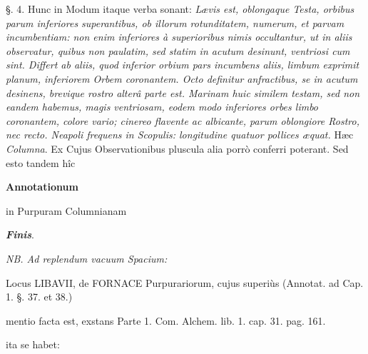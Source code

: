 \documentclass[a4paper, 11pt, oneside, polutonikogreek, german]{article}
\begin{document}
§. 4. Hunc in Modum itaque verba sonant: \emph{Lævis est, oblongaque Testa, orbibus parum inferiores superantibus, ob illorum rotunditatem, numerum, et parvam incumbentiam: non enim inferiores à superioribus nimis occultantur, ut in aliis observatur, quibus non paulatim, sed statim in acutum desinunt, ventriosi cum sint. Differt ab aliis, quod inferior orbium pars incumbens aliis, limbum exprimit planum, inferiorem Orbem coronantem. Octo definitur anfractibus, se in acutum desinens, brevique rostro alterâ parte est. Marinam huic similem testam, sed non eandem habemus, magis ventriosam, eodem modo inferiores orbes limbo coronantem, colore vario; cinereo flavente ac albicante, parum oblongiore Rostro, nec recto. Neapoli frequens in Scopulis: longitudine quatuor pollices æquat.} Hæc \emph{Columna}. Ex Cujus Observationibus pluscula alia porrò conferri poterant. Sed esto tandem hîc
\begin{center}
\textbf{Annotationum}

in Purpuram Columnianam

\emph{\textbf{Finis}}.
\end{center}

\bigskip
\centerline{\EightStarTaper}
\centerline{\EightStarTaper\EightStarTaper}
\bigskip
\begin{center}
\emph{NB. Ad replendum vacuum Spacium:}

Locus LIBAVII, de FORNACE Purpurariorum, cujus superiùs (Annotat. ad Cap. 1. §. 37. et 38.)

mentio facta est, exstans Parte 1. Com. Alchem. lib. 1. cap. 31. pag. 161.

ita se habet:
\end{center}
\end{document}
